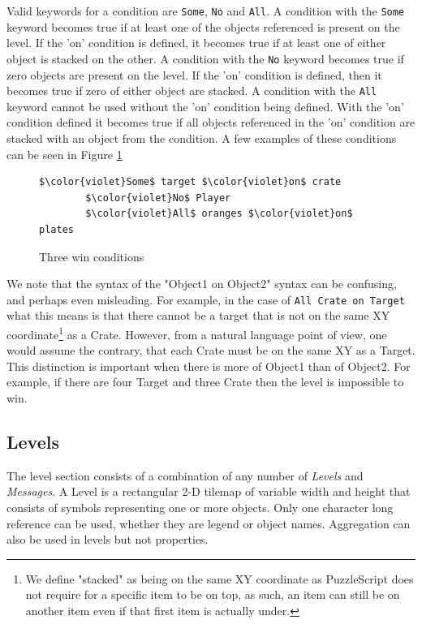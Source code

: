 Valid keywords for a condition are \texttt{Some}, \texttt{No} and \texttt{All}. A condition with the \texttt{Some} keyword becomes true if at least one of the objects referenced is present on the level. If the 'on' condition is defined, it becomes true if at least one of either object is stacked on the other. A condition with the \texttt{No} keyword becomes true if zero objects are present on the level. If the 'on' condition is defined, then it becomes true if zero of either object are stacked. A condition with the \texttt{All} keyword cannot be used without the 'on' condition being defined. With the 'on' condition defined it becomes true if all objects referenced in the 'on' condition are stacked with an object from the condition. A few examples of these conditions can be seen in Figure \ref{fig:conditions_code}

\begin{figure}
    \centering
    \begin{lstlisting}[language=PuzzleScript]
        $\color{violet}Some$ target $\color{violet}on$ crate
        $\color{violet}No$ Player
        $\color{violet}All$ oranges $\color{violet}on$ plates
    \end{lstlisting}
    \caption{Three win conditions}
    \label{fig:conditions_code}
\end{figure}

We note that the syntax of the "Object1 on Object2" syntax can be confusing, and perhaps even misleading. For example, in the case of \texttt{All Crate on Target} what this means is that there cannot be a target that is not on the same XY coordinate\footnote{We define "stacked" as being on the same XY coordinate as PuzzleScript does not require for a specific item to be on top, as such, an item can still be on another item even if that first item is actually under.} as a Crate. However, from a natural language point of view, one would assume the contrary, that each Crate must be on the same XY as a Target. This distinction is important when there is more of Object1 than of Object2. For example, if there are four Target and three Crate then the level is impossible to win.

\subsection{Levels}
The level section consists of a combination of any number of \emph{Levels} and \emph{Messages}.  A Level is a rectangular 2-D tilemap of variable width and height that consists of symbols representing one or more objects. Only one character long reference can be used, whether they are legend or object names. Aggregation can also be used in levels but not properties.

